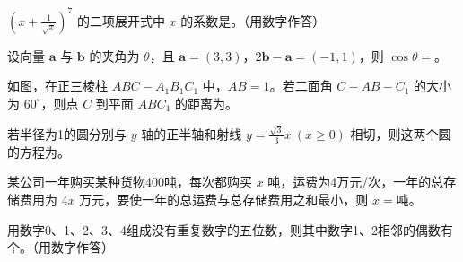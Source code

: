\begin{question}
$(x+\frac1{\sqrt{x}})^7$ 的二项展开式中 $x$ 的系数是\gkblank{}。（用数字作答）

\end{question}
\begin{question}
设向量 $\boldsymbol a$ 与 $\boldsymbol b$ 的夹角为 $\theta$，且 $\boldsymbol a=(3,3)$，$2\boldsymbol b-\boldsymbol a=(-1,1)$，则 $\cos\theta=$\gkblank{}。

\Needspace{0.4\textheight}
\end{question}
\begin{question}
如图，在正三棱柱 $ABC-A_1B_1C_1$ 中，$AB=1$。若二面角 $C-AB-C_1$ 的大小为 $60^\circ$，则点 $C$ 到平面 $ABC_1$ 的距离为\gkblank{}。
\nopagebreak[4]
\begin{center}\end{center}
\nopagebreak[4]
\end{question}
\begin{question}
若半径为1的圆分别与 $y$ 轴的正半轴和射线 $y=\frac{\sqrt3}{3}x\ (x\ge0)$ 相切，则这两个圆的方程为\gkblank{}。

\end{question}
\begin{question}
某公司一年购买某种货物400吨，每次都购买 $x$ 吨，运费为4万元/次，一年的总存储费用为 $4x$ 万元，要使一年的总运费与总存储费用之和最小，则 $x=$\gkblank{}吨。

\end{question}
\begin{question}
用数字0、1、2、3、4组成没有重复数字的五位数，则其中数字1、2相邻的偶数有\gkblank{}个。（用数字作答）

\end{question}

